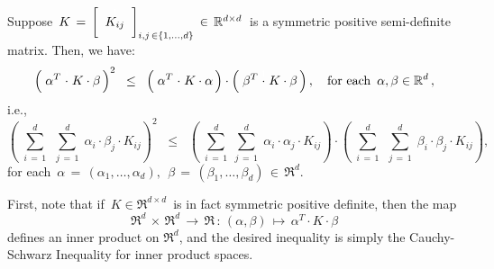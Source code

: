 \vskip 0.5cm
\begin{lemma}
\label{CauchySchwarzInequality}
\mbox{}
\vskip 0.1cm
\noindent
Suppose
\,$K \,=\, \left[\;\;\overset{{\color{white}1}}{K_{ij}}\;\;\right]_{i,j\,\in\{1,\ldots,d\}} \,\in\, \Re^{d \times d}$\,
is a symmetric positive semi-definite matrix.
Then, we have:
\begin{equation*}
\left(\;
	\alpha^{T} \overset{{\color{white}1}}{\cdot} K \cdot \beta
	\,\right)^{2}
\;\; \leq \;\;
	\left(\;
		\alpha^{T} \overset{{\color{white}1}}{\cdot} K \cdot \alpha
		\,\right)
	\cdot
	\left(\;
		\beta^{T} \overset{{\color{white}1}}{\cdot} K \cdot \beta
		\,\right),
\quad
\textnormal{for each \,$\alpha, \beta \in \Re^{d}$}\,,
\end{equation*}
i.e.,
\begin{equation*}
\left(\;
	\overset{d}{\underset{i\,=\,1}{\sum}}\;\,
	\overset{d}{\underset{j\,=\,1}{\sum}}\;
	\alpha_{i} \cdot \beta_{j} \cdot K_{ij}
	\right)^{2}
\;\; \leq \;\;
	\left(\;
		\overset{d}{\underset{i\,=\,1}{\sum}}\;
		\overset{d}{\underset{j\,=\,1}{\sum}}\;
		\alpha_{i} \cdot \alpha_{j} \cdot K_{ij}
		\right)
	\cdot
	\left(\;
		\overset{d}{\underset{i\,=\,1}{\sum}}\;\,
		\overset{d}{\underset{j\,=\,1}{\sum}}\;
		\beta_{i} \cdot \beta_{j} \cdot K_{ij}
		\right),
\end{equation*}
for each \,$\alpha \,=\, (\alpha_{1},\ldots,\alpha_{d}), \;\,\beta \,=\, (\beta_{1},\ldots,\beta_{d}) \,\in\,\Re^{d}$.
\end{lemma}
\proof
First, note that if \,$K \in \Re^{d \times d}$\, is in fact symmetric positive definite, then the map
\begin{equation*}
\Re^{d} \,\times\, \Re^{d} \,\longrightarrow\, \Re
\,:\,
(\alpha,\beta) \,\longmapsto\, \alpha^{T} \cdot K \cdot \beta
\end{equation*}
defines an inner product on $\Re^{d}$, and the desired inequality is simply the Cauchy-Schwarz Inequality
for inner product spaces.

